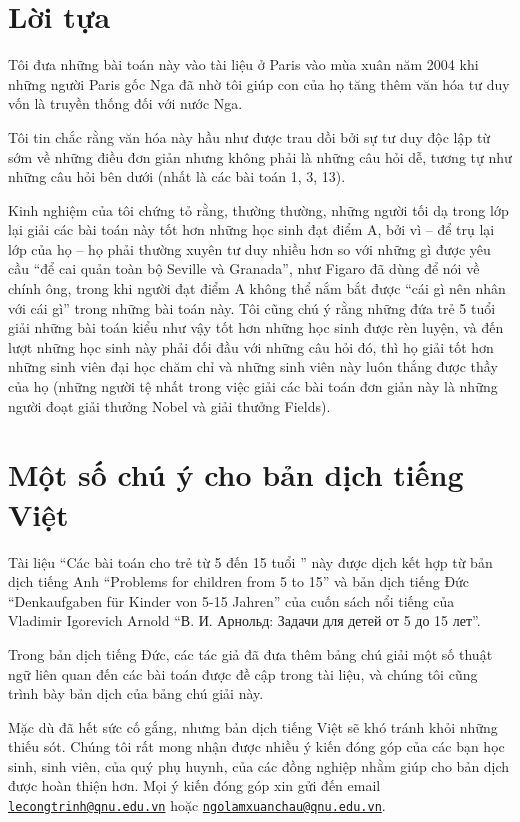 \clearpage
\section*{Lời tựa}
	Tôi đưa những bài toán này vào tài liệu ở Paris vào mùa xuân năm 2004 khi những người Paris gốc Nga đã nhờ tôi giúp con của họ tăng thêm văn hóa tư duy vốn là truyền thống đối với nước Nga.

	Tôi tin chắc rằng  văn hóa này hầu như được trau dồi bởi sự tư duy độc lập từ sớm về những điều đơn giản nhưng không phải là những câu hỏi dễ, tương tự như những câu hỏi bên dưới  (nhất là  các bài toán 1, 3, 13).

	Kinh nghiệm của tôi chứng tỏ rằng, thường thường, những người tối dạ trong lớp  lại giải các bài toán này tốt hơn những học sinh đạt điểm A, bởi vì -- để trụ lại lớp của họ -- họ phải thường xuyên tư duy nhiều hơn so với những gì được yêu cầu \enquote{để cai quản toàn bộ  Seville và Granada}, như Figaro đã dùng để nói về chính ông, trong khi người đạt điểm A không thể nắm bắt được \enquote{cái gì nên nhân với cái gì} trong những bài toán này. Tôi cũng chú ý rằng những đứa trẻ 5 tuổi giải những bài toán kiểu như vậy tốt hơn những học sinh được rèn luyện, và đến lượt những học sinh này phải đối đầu với những câu hỏi đó, thì họ giải tốt hơn những sinh viên đại học chăm chỉ và những sinh viên này luôn thắng được thầy của họ (những người tệ nhất trong việc giải các bài toán đơn giản này là những người đoạt giải thưởng Nobel và giải thưởng Fields).

\clearpage
\section*{Một số chú ý cho bản dịch tiếng Việt}
	Tài liệu \enquote{Các bài toán cho trẻ từ 5 đến 15 tuổi } này được dịch kết hợp  từ  bản dịch tiếng Anh \enquote{Problems for children from 5 to 15}  và bản dịch tiếng Đức \enquote{Denkaufgaben f\"{u}r Kinder von 5-15 Jahren} của cuốn sách nổi tiếng của Vladimir Igorevich Arnold {\enquote{{В. И. Арнольд: Задачи для детей от 5 до 15 лет}}}.

	Trong bản dịch tiếng Đức, các tác giả đã đưa thêm bảng chú giải một số thuật ngữ liên quan đến các bài toán được đề cập trong tài liệu, và chúng tôi cũng trình bày bản dịch của bảng chú giải này.

	Mặc dù đã hết sức cố gắng, nhưng bản dịch tiếng Việt sẽ khó tránh khỏi những thiếu sót. Chúng tôi rất mong nhận được nhiều ý kiến đóng góp của các bạn học sinh, sinh viên, của quý phụ huynh, của các đồng nghiệp nhằm giúp cho bản dịch được hoàn thiện hơn. Mọi ý kiến đóng góp xin gửi đến email \href{mailto:lecongtrinh@qnu.edu.vn}{\nolinkurl{lecongtrinh@qnu.edu.vn}} hoặc  \href{mailto:ngolamxuanchau@qnu.edu.vn}{\nolinkurl{ngolamxuanchau@qnu.edu.vn}}. 

